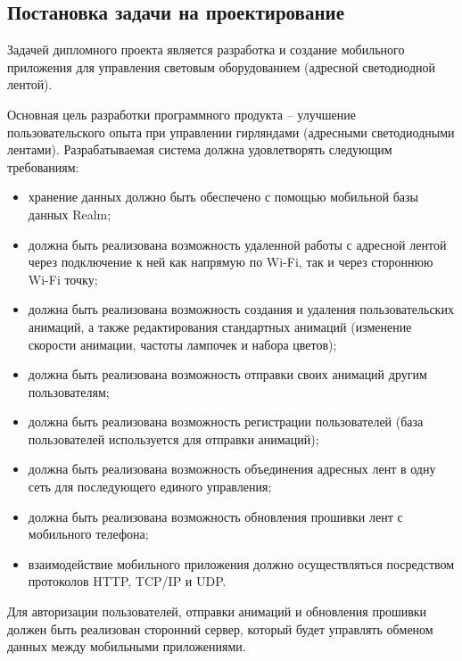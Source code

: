 \subsection{Постановка задачи на проектирование}
\label{sec:develop:task}

Задачей дипломного проекта является разработка и создание мобильного приложения для управления световым оборудованием (адресной светодиодной лентой). 

Основная цель разработки программного продукта – улучшение пользовательского опыта при управлении гирляндами (адресными светодиодными лентами).
Разрабатываемая система должна удовлетворять следующим требованиям:
\begin{itemize}
	\item хранение данных должно быть обеспечено с помощью мобильной базы данных Realm;
	\item должна быть реализована возможность удаленной работы с адресной лентой через подключение к ней как напрямую по Wi-Fi, так и через стороннюю Wi-Fi точку;
	\item должна быть реализована возможность создания и удаления пользовательских анимаций, а также редактирования стандартных анимаций (изменение скорости анимации, частоты лампочек и набора цветов);
	\item должна быть реализована возможность отправки своих анимаций другим пользователям;
	\item должна быть реализована возможность регистрации пользователей (база пользователей используется для отправки анимаций);
	\item должна быть реализована возможность объединения адресных лент в одну сеть для последующего единого управления;
	\item должна быть реализована возможность обновления прошивки лент с мобильного телефона;
	\item взаимодействие мобильного приложения должно осуществляться посредством протоколов HTTP, TCP/IP и UDP.
\end{itemize}

Для авторизации пользователей, отправки анимаций и обновления прошивки должен быть реализован сторонний сервер, который будет управлять обменом данных между мобильными приложениями.

